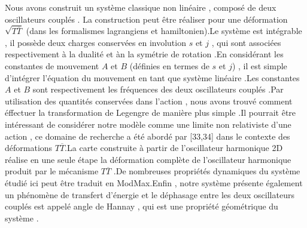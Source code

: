\documentclass[12pt,a4paper, openany]{article}
\begin{document}
Nous avons construit un système classique non linéaire , composé de deux oscillateurs couplés . La construction peut \^{e}tre réaliser pour une déformation $\sqrt{T\overline{T}}$ (dans les formalismes lagrangiens et hamiltonien).Le système est intégrable , il possède deux charges conservées en involution $s$ et $j$ , qui sont associées respectivement à la dualité et àn la symétrie de rotation .En considérant les constantes de mouvement $A$ et $B$ (définies en termes de $s$ et $j$) , il est simple d'intégrer l'équation du mouvement en tant que système linéaire .Les constantes $A$ et $B$ sont respectivement les fréquences des deux oscillateurs couplés .Par utilisation des quantités conservées dans l'action , nous avons trouvé comment éffectuer la transformation de Legengre de manière plus simple .Il pourrait \^{e}tre intéressant de considérer notre modèle comme une limite non relativiste d'une action , ce domaine de recherche a été abordé par [33,34] dans le contexte des déformations $T\overline{T}$.La carte construite à partir de l'oscillateur harmonique 2D réalise en une seule étape la déformation complète de l'oscillateur harmonique  produit par le mécanisme $T\overline{T}$  .De nombreuses propriétés dynamiques du système étudié ici peut \^{e}tre traduit en ModMax.Enfin , notre système présente également un phénomène de transfert d'énergie et le déphasage entre les deux oscillateurs couplés est appelé angle de Hannay , qui est une propriété géométrique du système .

		 
		 
		 
		  
		 
		 	  
		 
		 	
	
		 	
		 	
		 
		 	
		  	
		 
		  
		  
		   
		 
		  
		  
		 
	 
	
		
		
	
 
 
 
 
 
 
 

 	 
\end{document}
